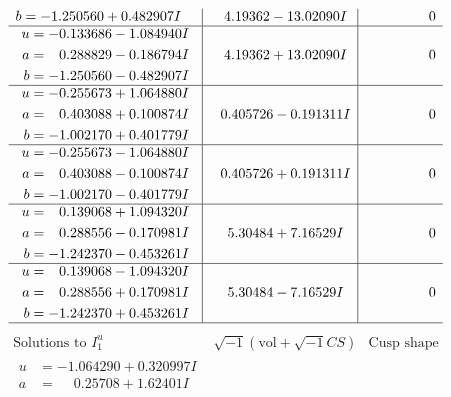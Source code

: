 \documentclass[1p]{elsarticle_modified}
\theoremstyle{definition}
\newcommand{\I}{\sqrt{-1}}
\begin{document}
$$\begin{array}{c|c|c}
\begin{aligned}
b &= -1.250560 + 0.482907 I\end{aligned}
 & \phantom{-}4.19362 - 13.02090 I & \phantom{-0.000000 } 0 \\ \hline\begin{aligned}
u &= -0.133686 - 1.084940 I \\
a &= \phantom{-}0.288829 - 0.186794 I \\
b &= -1.250560 - 0.482907 I\end{aligned}
 & \phantom{-}4.19362 + 13.02090 I & \phantom{-0.000000 } 0 \\ \hline\begin{aligned}
u &= -0.255673 + 1.064880 I \\
a &= \phantom{-}0.403088 + 0.100874 I \\
b &= -1.002170 + 0.401779 I\end{aligned}
 & \phantom{-}0.405726 - 0.191311 I & \phantom{-0.000000 } 0 \\ \hline\begin{aligned}
u &= -0.255673 - 1.064880 I \\
a &= \phantom{-}0.403088 - 0.100874 I \\
b &= -1.002170 - 0.401779 I\end{aligned}
 & \phantom{-}0.405726 + 0.191311 I & \phantom{-0.000000 } 0 \\ \hline\begin{aligned}
u &= \phantom{-}0.139068 + 1.094320 I \\
a &= \phantom{-}0.288556 - 0.170981 I \\
b &= -1.242370 - 0.453261 I\end{aligned}
 & \phantom{-}5.30484 + 7.16529 I & \phantom{-0.000000 } 0 \\ \hline\begin{aligned}
u &= \phantom{-}0.139068 - 1.094320 I \\
a &= \phantom{-}0.288556 + 0.170981 I \\
b &= -1.242370 + 0.453261 I\end{aligned}
 & \phantom{-}5.30484 - 7.16529 I & \phantom{-0.000000 } 0\\
 \hline 
 \end{array}$$\newpage$$\begin{array}{c|c|c}  
\text{Solutions to }I^u_{1}& \I (\text{vol} + \sqrt{-1}CS) & \text{Cusp shape}\\
 \hline 
\begin{aligned}
u &= -1.064290 + 0.320997 I \\
a &= \phantom{-}0.25708 + 1.62401 I \\

\end{aligned}
\end{array}$$
\end{document}
